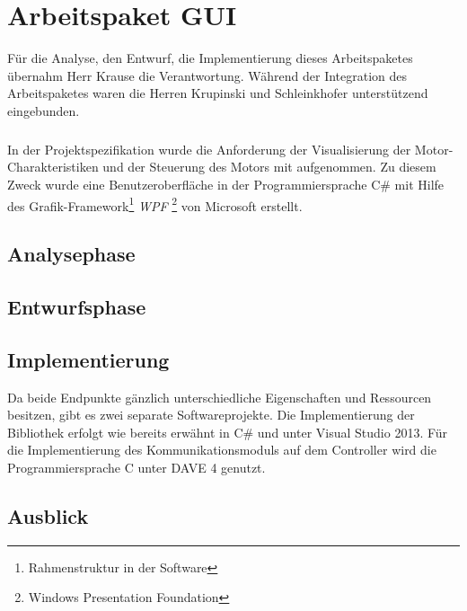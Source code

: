 \graphicspath{{./gui/Bilder/}}

\chapter{Arbeitspaket GUI}
Für die Analyse, den Entwurf, die Implementierung dieses Arbeitspaketes übernahm Herr Krause die Verantwortung. Während der Integration des Arbeitspaketes waren die Herren Krupinski und Schleinkhofer unterstützend eingebunden.
\paragraph{}
In der Projektspezifikation wurde die Anforderung der Visualisierung der Motor-Charakteristiken und der Steuerung des Motors mit aufgenommen. Zu diesem Zweck wurde eine Benutzeroberfläche in der Programmiersprache C# mit Hilfe des Grafik-Framework\footnote{Rahmenstruktur in der Software} \textit{WPF} \footnote{Windows Presentation Foundation} von Microsoft erstellt.
\section{Analysephase}

\section{Entwurfsphase}

\section{Implementierung}
Da beide Endpunkte gänzlich unterschiedliche Eigenschaften und Ressourcen besitzen, gibt es zwei separate Softwareprojekte. Die Implementierung der Bibliothek erfolgt wie bereits erwähnt in C\# und unter Visual Studio 2013. Für die Implementierung des Kommunikationsmoduls auf dem Controller wird die Programmiersprache C unter DAVE 4 genutzt. 
\section{Ausblick}





